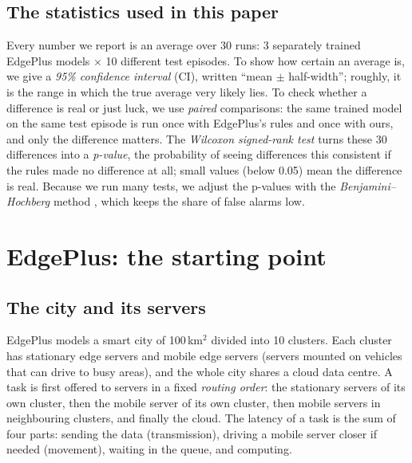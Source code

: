 \documentclass[11pt]{article}
\theoremstyle{definition}
\begin{document}
\subsection{The statistics used in this paper}
Every number we report is an average over 30 runs: 3 separately trained EdgePlus models $\times$ 10 different
test episodes. To show how certain an average is, we give a \emph{95\% confidence interval} (CI), written
``mean $\pm$ half-width''; roughly, it is the range in which the true average very likely lies. To check whether
a difference is real or just luck, we use \emph{paired} comparisons: the same trained model on the same test
episode is run once with EdgePlus's rules and once with ours, and only the difference matters. The
\emph{Wilcoxon signed-rank test} \cite{wilcoxon1945} turns these 30 differences into a \emph{p-value}, the
probability of seeing differences this consistent if the rules made no difference at all; small values (below
0.05) mean the difference is real. Because we run many tests, we adjust the p-values with the
\emph{Benjamini--Hochberg} method \cite{bh1995}, which keeps the share of false alarms low.

\section{EdgePlus: the starting point}
\label{sec:edgeplus}

\subsection{The city and its servers}
EdgePlus \cite{edgeplus2026} models a smart city of 100\,km$^2$ divided into 10 clusters. Each cluster has
stationary edge servers and mobile edge servers (servers mounted on vehicles that can drive to busy areas), and
the whole city shares a cloud data centre. A task is first offered to servers in a fixed \emph{routing order}:
the stationary servers of its own cluster, then the mobile server of its own cluster, then mobile servers in
neighbouring clusters, and finally the cloud. The latency of a task is the sum of four parts: sending the data
(transmission), driving a mobile server closer if needed (movement), waiting in the queue, and computing.
\end{document}
